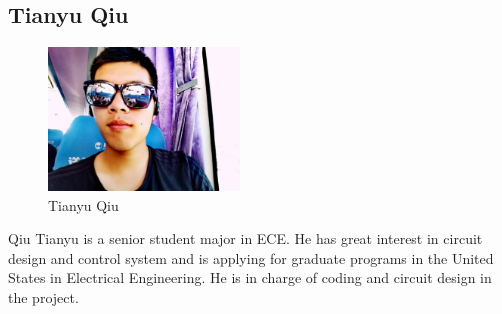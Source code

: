 \documentclass[12pt]{article}
\begin{document}
\subsection*{Tianyu Qiu}
\begin{figure}[H]
    \centering
    \includegraphics[width=2in]{q.jpg}
    \caption{Tianyu Qiu}
    \label{fig::qiu}
\end{figure}
Qiu Tianyu is a senior student major in ECE. He has great interest in circuit design and control system and is applying for graduate programs in the United States in Electrical Engineering. He is in charge of coding and circuit design in the project.
\end{document}
